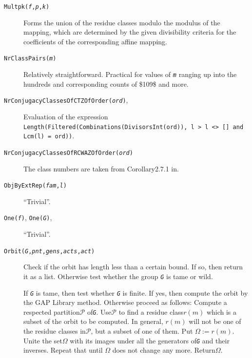 \documentclass[a4paper,11pt]{report}
\begin{document}
{\begin{description}
\item[{ \texttt{Multpk(\mbox{\texttt{\mdseries\slshape f}},\mbox{\texttt{\mdseries\slshape p}},\mbox{\texttt{\mdseries\slshape k}})} }]  Forms the union of the residue classes modulo the modulus of the mapping,
which are determined by the given divisibility criteria for the coefficients
of the corresponding affine mapping. 
\item[{ \texttt{NrClassPairs(\mbox{\texttt{\mdseries\slshape m}})} }]  Relatively straightforward. \texttt{}\texttt{} Practical
for values of \mbox{\texttt{\mdseries\slshape m}} ranging up into the hundreds and corresponding counts of
\$10\texttt{}9\$ and more. 
\item[{ \texttt{NrConjugacyClassesOfCTZOfOrder(\mbox{\texttt{\mdseries\slshape ord}})}, }]  Evaluation of the expression \texttt{Length(Filtered(Combinations(DivisorsInt(ord)), l
\texttt{}{\textgreater} l {\textless}{\textgreater} [] and Lcm(l) =
ord))}. 
\item[{ \texttt{NrConjugacyClassesOfRCWAZOfOrder(\mbox{\texttt{\mdseries\slshape ord}})} }]  The class numbers are taken from Corollary{\nobreakspace}2.7.1
in{\nobreakspace}\cite{Kohl05}. 
\item[{ \texttt{ObjByExtRep(\mbox{\texttt{\mdseries\slshape fam}},\mbox{\texttt{\mdseries\slshape l}})} }]  ``Trivial''. 
\item[{ \texttt{One(\mbox{\texttt{\mdseries\slshape f}})}, {\nobreakspace} \texttt{One(\mbox{\texttt{\mdseries\slshape G}})}, }]  ``Trivial''. 
\item[{ \texttt{Orbit(\mbox{\texttt{\mdseries\slshape G}},\mbox{\texttt{\mdseries\slshape pnt}},\mbox{\texttt{\mdseries\slshape gens}},\mbox{\texttt{\mdseries\slshape acts}},\mbox{\texttt{\mdseries\slshape act}})} }]  Check if the orbit has length less than a certain bound. If so, then return it
as a list. Otherwise test whether the group \mbox{\texttt{\mdseries\slshape G}} is tame or wild. 

 If \mbox{\texttt{\mdseries\slshape G}} is tame, then test whether \mbox{\texttt{\mdseries\slshape G}} is finite. If yes, then compute the orbit by the \textsf{GAP} Library method. Otherwise proceed as follows: Compute a respected
partition{\nobreakspace}$\mathcal{P}$ of{\nobreakspace}\mbox{\texttt{\mdseries\slshape G}}. Use{\nobreakspace}$\mathcal{P}$ to find a residue class{\nobreakspace}$r(m)$ which is a subset of the orbit to be computed. In general, $r(m)$ will not be one of the residue classes in{\nobreakspace}$\mathcal{P}$, but a subset of one of them. Put $\Omega := r(m)$. Unite the set{\nobreakspace}$\Omega$ with its images under all the generators of{\nobreakspace}\mbox{\texttt{\mdseries\slshape G}} and their inverses. Repeat that until $\Omega$ does not change any more. Return{\nobreakspace}$\Omega$. 


\end{description}}
\end{document}

